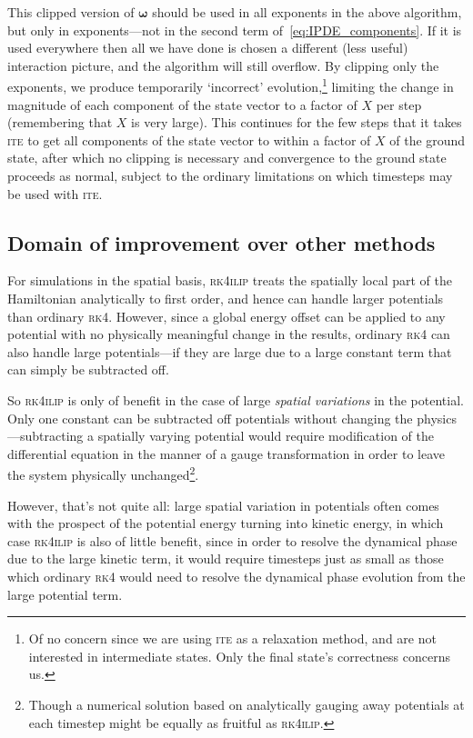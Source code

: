 This clipped version of $\mathbf{\omega}$ should be used in all exponents in the above algorithm, but only in exponents---not in the second term of~\eqref{eq:IPDE_components}. If it is used everywhere then all we have done is chosen a different (less useful) interaction picture, and the algorithm will still overflow. By clipping only the exponents, we produce temporarily `incorrect' evolution,\footnote{Of no concern since we are using \textsc{ite} as a relaxation method, and are not interested in intermediate states. Only the final state's correctness concerns us.} limiting the change in magnitude of each component of the state vector to a factor of $X$ per step (remembering that $X$ is very large). This continues for the few steps that it takes \textsc{ite} to get all components of the state vector to within a factor of $X$ of the ground state, after which no clipping is necessary and convergence to the ground state proceeds as normal, subject to the ordinary limitations on which timesteps may be used with \textsc{ite}.

\subsection{Domain of improvement over other methods}

For simulations in the spatial basis, \textsc{rk4ilip} treats the spatially local part of the Hamiltonian analytically to first order, and hence can handle larger potentials than ordinary \textsc{rk4}. However, since a global energy offset can be applied to any potential with no physically meaningful change in the results, ordinary \textsc{rk4} can also handle large potentials---if they are large due to a large constant term that can simply be subtracted off.

So \textsc{rk4ilip} is only of benefit in the case of large \emph{spatial variations} in the potential. Only one constant can be subtracted off potentials without changing the physics---subtracting a spatially varying potential would require modification of the differential equation in the manner of a gauge transformation in order to leave the system physically unchanged\footnote{Though a numerical solution based on analytically gauging away potentials at each timestep might be equally as fruitful as \textsc{rk4ilip}.}.

However, that's not quite all: large spatial variation in potentials often comes with the prospect of the potential energy turning into kinetic energy, in which case \textsc{rk4ilip} is also of little benefit, since in order to resolve the dynamical phase due to the large kinetic term, it would require timesteps just as small as those which ordinary \textsc{rk4} would need to resolve the dynamical phase evolution from the large potential term.

